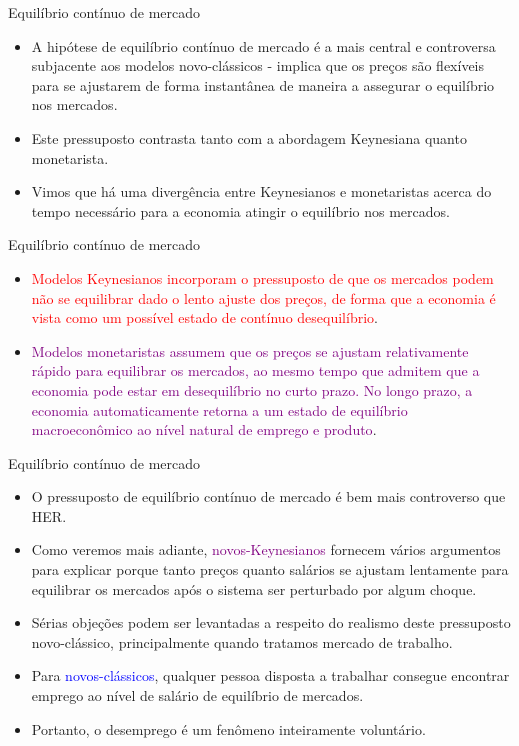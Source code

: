 \documentclass[10pt]{beamer}
\begin{document}
\begin{frame}{Equilíbrio contínuo de mercado}
    \begin{itemize}
        \item A hipótese de equilíbrio contínuo de mercado é a mais central e controversa subjacente aos modelos novo-clássicos - implica que os preços são flexíveis para se ajustarem de forma instantânea de maneira a assegurar o equilíbrio nos mercados.
        \bigskip
        \item Este pressuposto contrasta tanto com a abordagem Keynesiana quanto monetarista.
        \bigskip
        \item Vimos que há uma divergência entre Keynesianos e monetaristas acerca do tempo necessário para a economia atingir o equilíbrio nos mercados.
    \end{itemize}
\end{frame}

\begin{frame}{Equilíbrio contínuo de mercado}
    \begin{itemize}
        \item \textcolor{red}{Modelos Keynesianos incorporam o pressuposto de que os mercados podem não se equilibrar dado o lento ajuste dos preços, de forma que a economia é vista como um possível estado de contínuo desequilíbrio}.
        \bigskip
        \item \textcolor{purple}{Modelos monetaristas assumem que os preços se ajustam relativamente rápido para equilibrar os mercados, ao mesmo tempo que admitem que a economia pode estar em desequilíbrio no curto prazo. No longo prazo, a economia automaticamente retorna a um estado de equilíbrio macroeconômico ao nível natural de emprego e produto}.
    \end{itemize}
\end{frame}

\begin{frame}{Equilíbrio contínuo de mercado}
    \begin{itemize}
        \item O pressuposto de equilíbrio contínuo de mercado é bem mais controverso que HER.
        \bigskip
        \item Como veremos mais adiante, \textcolor{purple}{novos-Keynesianos} fornecem vários argumentos para explicar porque tanto preços quanto salários se ajustam lentamente para equilibrar os mercados após o sistema ser perturbado por algum choque.
        \bigskip
        \item Sérias objeções podem ser levantadas a respeito do realismo deste pressuposto novo-clássico, principalmente quando tratamos mercado de trabalho.
        \bigskip
        \item Para \textcolor{blue}{novos-clássicos}, qualquer pessoa disposta a trabalhar consegue encontrar emprego ao nível de salário de equilíbrio de mercados.
        \bigskip
        \item Portanto, o desemprego é um fenômeno inteiramente voluntário.
    \end{itemize}
\end{frame}
\end{document}

